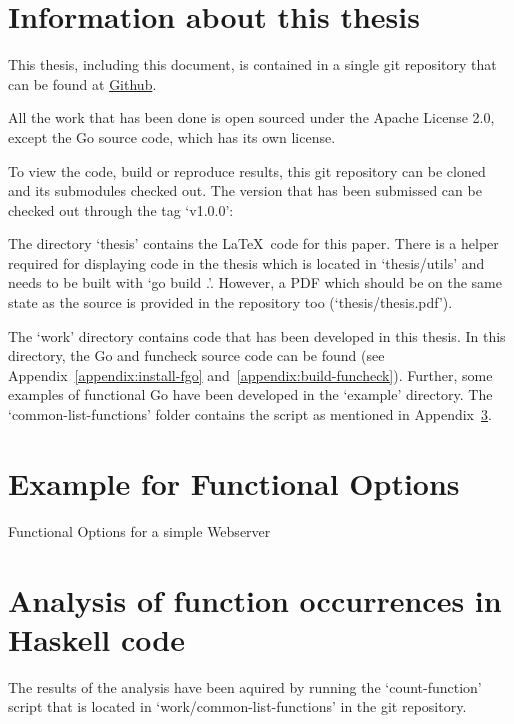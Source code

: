\section{Information about this thesis}

This thesis, including this document, is contained in a single git repository
that can be found at \href{github.com/tommyknows/bachelor-thesis.git}{Github}.

All the work that has been done is open sourced under the Apache License 2.0,
except the Go source code, which has its own license.

To view the code, build or reproduce results, this git repository can be cloned
and its submodules checked out. The version that has been submissed can be checked
out through the tag `v1.0.0':

The directory `thesis' contains the \LaTeX\ code for this paper. There is a helper
required for displaying code in the thesis which is located in `thesis/utils' and
needs to be built with `go build .'. However, a PDF which should be on the same state
as the source is provided in the repository too (`thesis/thesis.pdf').

The `work' directory contains code that has been developed in this thesis. In this
directory, the Go and funcheck source code can be found (see Appendix~\ref{appendix:install-fgo}
and~\ref{appendix:build-funcheck}). Further, some examples
of functional Go have been developed in the `example' directory. The `common-list-functions'
folder contains the script as mentioned in Appendix~\ref{appendix:function-occurrences}.


\section{Example for Functional Options}\label{appendix:funcopts}
\begin{code}
    \caption{Functional Options for a simple Webserver}
\end{code}

\section{Analysis of function occurrences in Haskell code}\label{appendix:function-occurrences}
The results of the analysis have been aquired by running the `count-function' script
that is located in `work/common-list-functions' in the git repository\autocite{git-repo}.

